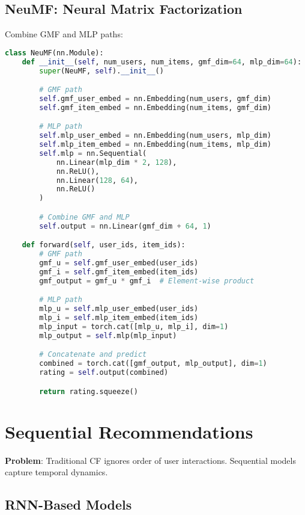 \documentclass[10pt]{article}
\begin{document}
\subsection{NeuMF: Neural Matrix Factorization}

Combine GMF and MLP paths:
\begin{lstlisting}[language=Python]
class NeuMF(nn.Module):
    def __init__(self, num_users, num_items, gmf_dim=64, mlp_dim=64):
        super(NeuMF, self).__init__()

        # GMF path
        self.gmf_user_embed = nn.Embedding(num_users, gmf_dim)
        self.gmf_item_embed = nn.Embedding(num_items, gmf_dim)

        # MLP path
        self.mlp_user_embed = nn.Embedding(num_users, mlp_dim)
        self.mlp_item_embed = nn.Embedding(num_items, mlp_dim)
        self.mlp = nn.Sequential(
            nn.Linear(mlp_dim * 2, 128),
            nn.ReLU(),
            nn.Linear(128, 64),
            nn.ReLU()
        )

        # Combine GMF and MLP
        self.output = nn.Linear(gmf_dim + 64, 1)

    def forward(self, user_ids, item_ids):
        # GMF path
        gmf_u = self.gmf_user_embed(user_ids)
        gmf_i = self.gmf_item_embed(item_ids)
        gmf_output = gmf_u * gmf_i  # Element-wise product

        # MLP path
        mlp_u = self.mlp_user_embed(user_ids)
        mlp_i = self.mlp_item_embed(item_ids)
        mlp_input = torch.cat([mlp_u, mlp_i], dim=1)
        mlp_output = self.mlp(mlp_input)

        # Concatenate and predict
        combined = torch.cat([gmf_output, mlp_output], dim=1)
        rating = self.output(combined)

        return rating.squeeze()
\end{lstlisting}

\section{Sequential Recommendations}

\textbf{Problem}: Traditional CF ignores order of user interactions. Sequential models capture temporal dynamics.

\subsection{RNN-Based Models}
\end{document}
